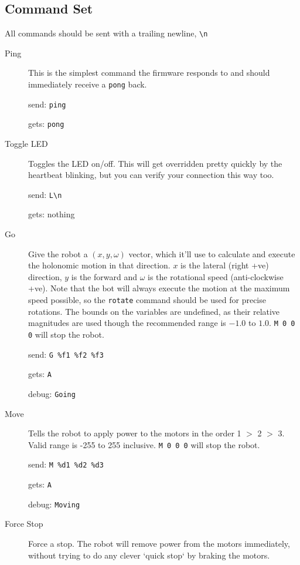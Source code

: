 \subsection{Command Set}

All commands should be sent with a trailing newline, \verb|\n|

\begin{description}

\item[Ping]
  This is the simplest command the firmware responds to and should immediately receive a \verb|pong| back.

  send: \verb|ping|
  
  gets: \verb|pong|
  

\item[Toggle LED]
  Toggles the LED on/off. This will get overridden pretty quickly by the heartbeat blinking, but you can verify your connection this way too.

  send: \verb|L\n|
  
  gets: nothing

\item[Go] 
  Give the robot a $(x,y,\omega)$ vector, which it'll use to calculate and execute the holonomic motion in that direction. $x$ is the lateral (right +ve) direction, $y$ is the forward and $\omega$ is the rotational speed (anti-clockwise +ve). Note that the bot will always execute the motion at the maximum speed possible, so the \verb|rotate| command should be used for precise rotations. The bounds on the variables are undefined, as their relative magnitudes are used though the recommended range is $-1.0$ to $1.0$. \verb|M 0 0 0| will stop the robot.

  send: \verb|G %f1 %f2 %f3|
  
  gets: \verb|A|

  debug: \verb|Going|
  
\item[Move] 
  Tells the robot to apply power to the motors in the order 1 $>$ 2 $>$ 3. Valid range is -255 to 255 inclusive. \verb|M 0 0 0| will stop the robot.

  send: \verb|M %d1 %d2 %d3|
  
  gets: \verb|A|

  debug: \verb|Moving|

  
\item[Force Stop]
  Force a stop. The robot will remove power from the motors immediately, without trying to do any clever `quick stop` by braking the motors.
  

\end{description}
